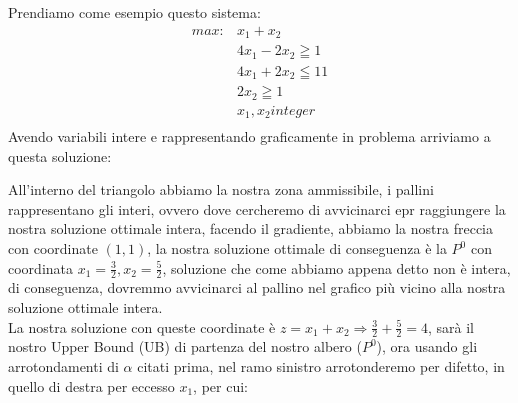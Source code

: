 \documentclass{article}
\begin{document}
Prendiamo come esempio questo sistema:\\
\begin{align*}
max:  &x_1 + x_2 \\
    	&4x_1 - 2x_2 \geqq 1\\
    	&4x_1 + 2x_2 \leqq 11\\
    	&2x_2 \geqq 1\\
    	&x_1,x_2 integer\\
\end{align*}
Avendo variabili intere e rappresentando graficamente in problema arriviamo a questa soluzione:\\
\begin{center}
\end{center}
All'interno del triangolo abbiamo la nostra zona ammissibile, i pallini rappresentano gli interi, ovvero dove cercheremo di avvicinarci epr raggiungere la nostra soluzione ottimale intera, facendo il gradiente, abbiamo la nostra freccia con coordinate $(1,1)$, la nostra soluzione ottimale di conseguenza è la $P^0$ con coordinata $x_1=\frac{3}{2},x_2=\frac{5}{2}$, soluzione che come abbiamo appena detto non è intera, di conseguenza, dovremmo avvicinarci al pallino nel grafico più vicino alla nostra soluzione ottimale intera.\\
La nostra soluzione con queste coordinate è $z = x_1 + x_2 \Rightarrow \frac{3}{2} + \frac{5}{2} = 4$, sarà il nostro Upper Bound (UB) di partenza del nostro albero ($P^0$), ora usando gli arrotondamenti di $\alpha$ citati prima, nel ramo sinistro arrotonderemo per difetto, in quello di destra per eccesso $x_1$, per cui:\\
\end{document}

